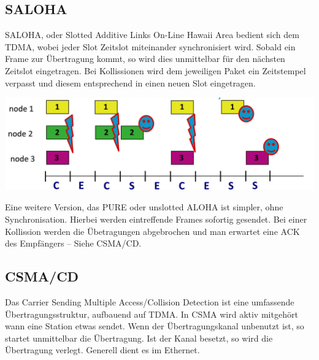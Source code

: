 \documentclass{article}
\begin{document}
    \subsection{SALOHA}
    SALOHA, oder Slotted Additive Links On-Line Hawaii Area bedient sich dem TDMA, wobei jeder Slot Zeitslot miteinander synchronisiert wird.
    Sobald ein Frame zur Übertragung kommt, so wird dies unmittelbar für den nächsten Zeitslot eingetragen. Bei Kollissionen wird dem jeweiligen Paket ein Zeitstempel verpasst und diesem entsprechend in einen neuen Slot eingetragen.
    \begin{center}
        \includegraphics[width=\textwidth]{Aloha.png}
    \end{center}
    
    Eine weitere Version, das PURE oder unslotted ALOHA ist simpler, ohne Synchronisation. Hierbei werden eintreffende Frames sofortig gesendet.
    Bei einer Kollission werden die Übetragungen abgebrochen und man erwartet eine ACK des Empfängers -- Siehe CSMA/CD.
    
    \subsection{CSMA/CD}
    Das Carrier Sending Multiple Access/Collision Detection ist eine umfassende Übertragungsstruktur, aufbauend auf TDMA.
    In CSMA wird aktiv mitgehört wann eine Station etwas sendet. Wenn der Übertragungskanal unbenutzt ist, so startet unmittelbar die Übertragung. Ist der Kanal besetzt, so wird die Übertragung verlegt. Generell dient es im Ethernet.
    
\end{document}
